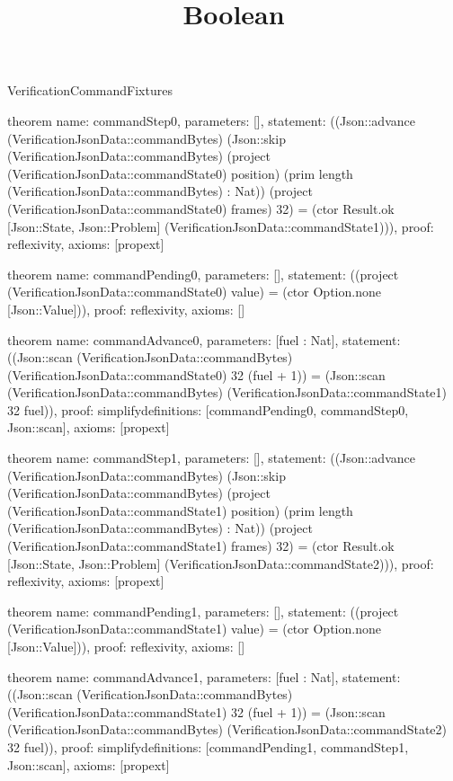 \begin{lexlean}{VerificationCommandFixtures}
\title{Boolean}
\begin{semanticmodule}

theorem{
  name: commandStep0,
  parameters: [],
  statement: ((Json::advance (VerificationJsonData::commandBytes) (Json::skip (VerificationJsonData::commandBytes) (project (VerificationJsonData::commandState0) position) (prim length (VerificationJsonData::commandBytes) : Nat)) (project (VerificationJsonData::commandState0) frames) 32) = (ctor Result.ok [Json::State, Json::Problem] (VerificationJsonData::commandState1))),
  proof: reflexivity{},
  axioms: [propext]
}

theorem{
  name: commandPending0,
  parameters: [],
  statement: ((project (VerificationJsonData::commandState0) value) = (ctor Option.none [Json::Value])),
  proof: reflexivity{},
  axioms: []
}

theorem{
  name: commandAdvance0,
  parameters: [fuel : Nat],
  statement: ((Json::scan (VerificationJsonData::commandBytes) (VerificationJsonData::commandState0) 32 (fuel + 1)) = (Json::scan (VerificationJsonData::commandBytes) (VerificationJsonData::commandState1) 32 fuel)),
  proof: simplify{definitions: [commandPending0, commandStep0, Json::scan]},
  axioms: [propext]
}

theorem{
  name: commandStep1,
  parameters: [],
  statement: ((Json::advance (VerificationJsonData::commandBytes) (Json::skip (VerificationJsonData::commandBytes) (project (VerificationJsonData::commandState1) position) (prim length (VerificationJsonData::commandBytes) : Nat)) (project (VerificationJsonData::commandState1) frames) 32) = (ctor Result.ok [Json::State, Json::Problem] (VerificationJsonData::commandState2))),
  proof: reflexivity{},
  axioms: [propext]
}

theorem{
  name: commandPending1,
  parameters: [],
  statement: ((project (VerificationJsonData::commandState1) value) = (ctor Option.none [Json::Value])),
  proof: reflexivity{},
  axioms: []
}

theorem{
  name: commandAdvance1,
  parameters: [fuel : Nat],
  statement: ((Json::scan (VerificationJsonData::commandBytes) (VerificationJsonData::commandState1) 32 (fuel + 1)) = (Json::scan (VerificationJsonData::commandBytes) (VerificationJsonData::commandState2) 32 fuel)),
  proof: simplify{definitions: [commandPending1, commandStep1, Json::scan]},
  axioms: [propext]
}


\end{semanticmodule}
\end{lexlean}
